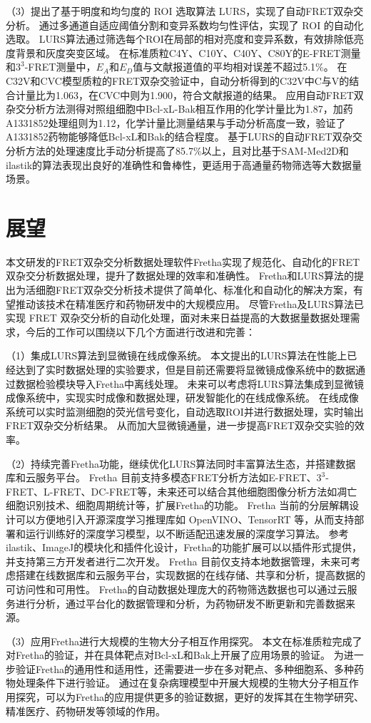 （3）提出了基于明度和均匀度的 ROI 选取算法 LURS，实现了自动FRET双杂交分析。
通过多通道自适应阈值分割和变异系数均匀性评估，实现了 ROI 的自动化选取。
LURS算法通过筛选每个ROI在局部的相对亮度和变异系数，有效排除低亮度背景和灰度突变区域。
在标准质粒C4Y、C10Y、C40Y、C80Y的E-FRET测量和$3^3$-FRET测量中，$E_{A}$和$E_{D}$值与文献报道值的平均相对误差不超过5.1\%。
在C32V和CVC模型质粒的FRET双杂交验证中，自动分析得到的C32V中C与V的结合计量比为1.063，在CVC中则为1.900，符合文献报道的结果。
应用自动FRET双杂交分析方法测得对照组细胞中Bcl-xL-Bak相互作用的化学计量比为1.87，加药A1331852处理组则为1.12，化学计量比测量结果与手动分析高度一致，验证了A1331852药物能够降低Bcl-xL和Bak的结合程度。
基于LURS的自动FRET双杂交分析方法的处理速度比手动分析提高了85.7\%以上，且对比基于SAM-Med2D和ilastik的算法表现出良好的准确性和鲁棒性，更适用于高通量药物筛选等大数据量场景。

\section{展望}
本文研发的FRET双杂交分析数据处理软件Fretha实现了规范化、自动化的FRET双杂交分析数据处理，提升了数据处理的效率和准确性。
Fretha和LURS算法的提出为活细胞FRET双杂交分析技术提供了简单化、标准化和自动化的解决方案，有望推动该技术在精准医疗和药物研发中的大规模应用。
尽管Fretha及LURS算法已实现 FRET 双杂交分析的自动化处理，面对未来日益提高的大数据量数据处理需求，今后的工作可以围绕以下几个方面进行改进和完善：

（1）集成LURS算法到显微镜在线成像系统。
本文提出的LURS算法在性能上已经达到了实时数据处理的实验要求，但是目前还需要将显微镜成像系统中的数据通过数据检验模块导入Fretha中离线处理。
未来可以考虑将LURS算法集成到显微镜成像系统中，实现实时成像和数据处理，研发智能化的在线成像系统。
在线成像系统可以实时监测细胞的荧光信号变化，自动选取ROI并进行数据处理，实时输出FRET双杂交分析结果。
从而加大显微镜通量，进一步提高FRET双杂交实验的效率。

（2）持续完善Fretha功能，继续优化LURS算法同时丰富算法生态，并搭建数据库和云服务平台。
Fretha 目前支持多模态FRET分析方法如E-FRET、$3^3$-FRET、L-FRET、DC-FRET等，未来还可以结合其他细胞图像分析方法如凋亡细胞识别技术、细胞周期统计等，扩展Fretha的功能。
Fretha 当前的分层解耦设计可以方便地引入开源深度学习推理库如 OpenVINO、TensorRT 等，从而支持部署和运行训练好的深度学习模型，以不断适配迅速发展的深度学习算法。
参考ilastik、ImageJ的模块化和插件化设计，Fretha的功能扩展可以以插件形式提供，并支持第三方开发者进行二次开发。
Fretha 目前仅支持本地数据管理，未来可考虑搭建在线数据库和云服务平台，实现数据的在线存储、共享和分析，提高数据的可访问性和可用性。
Fretha的自动数据处理庞大的药物筛选数据也可以通过云服务进行分析，通过平台化的数据管理和分析，为药物研发不断更新和完善数据来源。

（3）应用Fretha进行大规模的生物大分子相互作用探究。
本文在标准质粒完成了对Fretha的验证，并在具体靶点对Bcl-xL和Bak上开展了应用场景的验证。
为进一步验证Fretha的通用性和适用性，还需要进一步在多对靶点、多种细胞系、多种药物处理条件下进行验证。
通过在复杂病理模型中开展大规模的生物大分子相互作用探究，可以为Fretha的应用提供更多的验证数据，更好的发挥其在生物学研究、精准医疗、药物研发等领域的作用。
